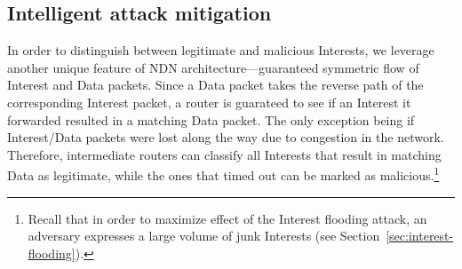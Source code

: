 


\subsection{Intelligent attack mitigation}
\label{sec:intelligent mitigating}


In order to distinguish between legitimate and malicious Interests, we leverage another unique feature of  NDN architecture---guaranteed symmetric flow of Interest and Data packets. Since a Data packet takes the reverse path of the corresponding Interest packet, a router is guarateed to see if an Interest it forwarded resulted in a matching Data packet. The only exception being if Interest/Data packets were lost along the way due to congestion in the network.
Therefore, intermediate routers can classify all Interests that result in matching Data as legitimate, while the ones that timed out can be marked as malicious.\footnote{Recall that in order to maximize effect of the Interest flooding attack, an adversary expresses a large volume of junk Interests (see Section~\ref{sec:interest-flooding}).}  

